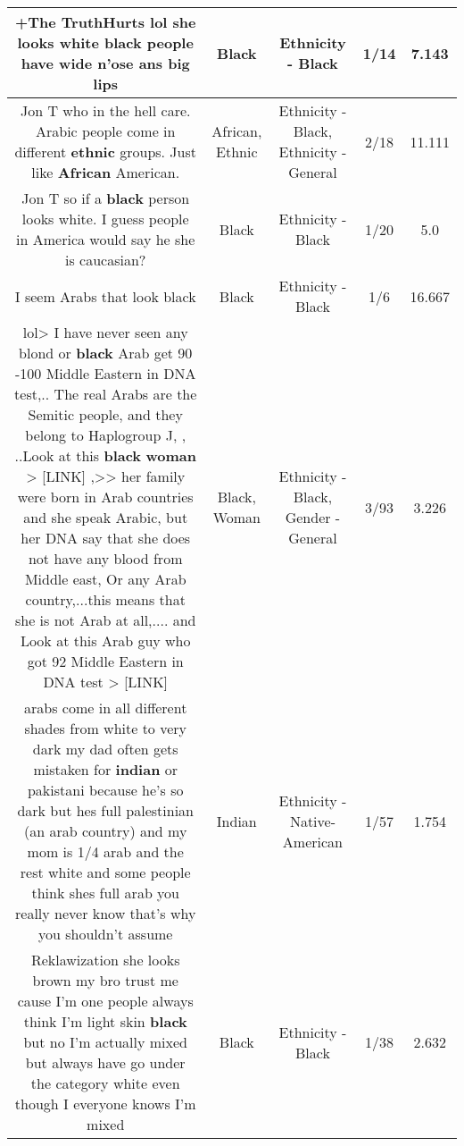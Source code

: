 \documentclass[11pt]{article}
\newlength\mylength
\begin{document}
\begin{center}
\begin{longtable}{|C{.65\mylength}|C{.30\mylength}|C{.12\mylength}|C{.12\mylength}|C{.12\mylength}|}
  \small +The TruthHurts lol she looks white \textbf{black} people have wide n'ose ans big lips\normalsize   & Black & Ethnicity - Black & 1/14 & 7.143 \\  \hline
  \small Jon T who in the hell care. Arabic people come in different \textbf{ethnic} groups. Just like \textbf{African} American.\normalsize   & African, Ethnic & Ethnicity - Black, Ethnicity - General & 2/18 & 11.111 \\  \hline
  \small Jon T so if a \textbf{black} person looks white. I guess people in America would say he she is caucasian?\normalsize   & Black & Ethnicity - Black & 1/20 & 5.0 \\  \hline
  \small I seem Arabs that look black\normalsize   & Black & Ethnicity - Black & 1/6 & 16.667 \\  \hline
  \small lol> I have never seen any blond or \textbf{black} Arab get 90 -100 Middle Eastern in DNA test,.. The real Arabs are the Semitic people, and they belong to Haplogroup J, , ..Look at this \textbf{black} \textbf{woman} >  [LINK]  ,>> her family were born in Arab countries and  she speak Arabic, but  her DNA say that she does not have any blood from Middle east, Or any Arab country,...this means that she is not Arab at all,.... and Look at this Arab guy who got 92 Middle Eastern in DNA test >    [LINK] \normalsize   & Black, Woman & Ethnicity - Black, Gender - General & 3/93 & 3.226 \\  \hline
  \small arabs come in all different shades from white to very dark my dad often gets mistaken for \textbf{indian} or pakistani because he's so dark but hes full palestinian (an arab country) and my mom is 1/4 arab and the rest white and some people think shes full arab you really never know that's why you shouldn't assume\normalsize   & Indian & Ethnicity - Native-American & 1/57 & 1.754 \\  \hline
  \small Reklawization she looks brown my bro trust me cause I'm one people always think I'm light skin \textbf{black} but no I'm actually mixed but always have go under the category white even though I everyone knows I'm mixed\normalsize   & Black & Ethnicity - Black & 1/38 & 2.632 \\  \hline

\end{longtable}
\end{center}
\end{document}
